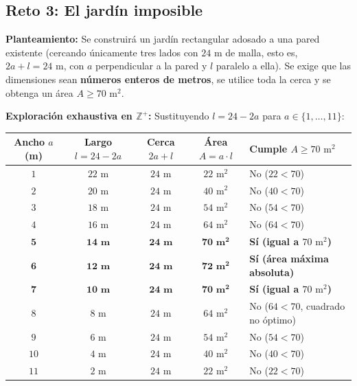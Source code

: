 \documentclass[spanish,letterpaper,oneside]{article}
\begin{document}
\subsection{Reto 3: El jardín imposible}
\textbf{Planteamiento:} Se construirá un jardín rectangular adosado a una pared existente (cercando únicamente tres lados con $24\text{ m}$ de malla, esto es, $2a + l = 24\text{ m}$, con $a$ perpendicular a la pared y $l$ paralelo a ella). Se exige que las dimensiones sean \textbf{números enteros de metros}, se utilice toda la cerca y se obtenga un área $A \ge 70\text{ m}^2$.

\textbf{Exploración exhaustiva en $\mathbb{Z}^+$:} Sustituyendo $l = 24 - 2a$ para $a \in \{1,\dots,11\}$:

{\footnotesize{}\renewcommand{\arraystretch}{1.12}
\noindent\begin{tabularx}{\textwidth}{|c|c|c|c|>{\raggedright\arraybackslash}X|}\hline
\rowcolor{iiiepePale} \textbf{Ancho $a$ (m)} & \textbf{Largo $l=24-2a$} & \textbf{Cerca $2a+l$} & \textbf{Área $A=a\cdot l$} & \textbf{Cumple $A\ge 70\text{ m}^2$} \\\hline
$1$ & $22\text{ m}$ & $24\text{ m}$ & $22\text{ m}^2$ & No ($22 < 70$) \\\hline
$2$ & $20\text{ m}$ & $24\text{ m}$ & $40\text{ m}^2$ & No ($40 < 70$) \\\hline
$3$ & $18\text{ m}$ & $24\text{ m}$ & $54\text{ m}^2$ & No ($54 < 70$) \\\hline
$4$ & $16\text{ m}$ & $24\text{ m}$ & $64\text{ m}^2$ & No ($64 < 70$) \\\hline
$\mathbf{5}$ & $\mathbf{14\text{ m}}$ & $\mathbf{24\text{ m}}$ & $\mathbf{70\text{ m}^2}$ & \textbf{Sí (igual a $70\text{ m}^2$)} \\\hline
$\mathbf{6}$ & $\mathbf{12\text{ m}}$ & $\mathbf{24\text{ m}}$ & $\mathbf{72\text{ m}^2}$ & \textbf{Sí (área máxima absoluta)} \\\hline
$\mathbf{7}$ & $\mathbf{10\text{ m}}$ & $\mathbf{24\text{ m}}$ & $\mathbf{70\text{ m}^2}$ & \textbf{Sí (igual a $70\text{ m}^2$)} \\\hline
$8$ & $8\text{ m}$ & $24\text{ m}$ & $64\text{ m}^2$ & No ($64 < 70$, cuadrado no óptimo) \\\hline
$9$ & $6\text{ m}$ & $24\text{ m}$ & $54\text{ m}^2$ & No ($54 < 70$) \\\hline
$10$ & $4\text{ m}$ & $24\text{ m}$ & $40\text{ m}^2$ & No ($40 < 70$) \\\hline
$11$ & $2\text{ m}$ & $24\text{ m}$ & $22\text{ m}^2$ & No ($22 < 70$) \\\hline
\end{tabularx}}
\vspace{4pt}
\end{document}
